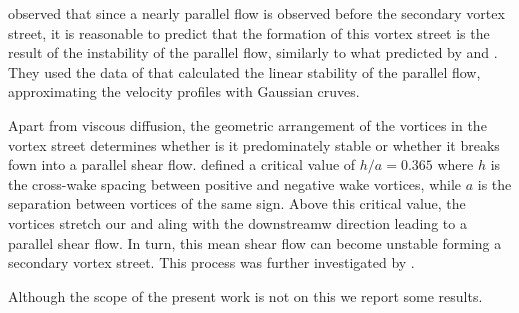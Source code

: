 \cite{karasudani-funakoshi-1994} observed that since a nearly parallel flow is observed before the secondary vortex street, it is reasonable to predict that the formation of this vortex street is the result of the instability of the parallel flow, similarly to what predicted by \cite{taneda-1959} and \cite{cimbala-1988}. They used the data of \cite{fujimura-etal-1988} that calculated the linear stability of the parallel flow, approximating the velocity profiles with Gaussian cruves.

\cite{jhonson-thompson-hourigan-2004}

\cite{alksyuk-shkadova-shkadov-2012}

Apart from viscous diffusion, the geometric arrangement of the vortices in the vortex street determines whether is it predominately stable or whether it breaks fown into a parallel shear flow. \cite{durgin-karlsson-1971} defined a critical value of $h/a = 0.365$ where $h$ is the cross-wake spacing between positive and negative wake vortices, while $a$ is the separation between vortices of the same sign. Above this critical value, the vortices stretch our and aling with the downstreamw direction leading to a parallel shear flow. In turn, this mean shear flow can become unstable forming a secondary vortex street. This process was further investigated by \cite{karasudani-funakoshi-1994}.

Although the scope of the present work is not on this we report some results.

